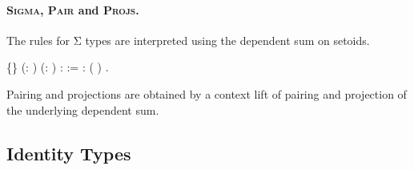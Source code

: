   \paragraph{\textsc{Sigma}, \textsc{Pair} and \textsc{Projs}.}
  The rules for Σ types are interpreted using the 
  dependent sum \coqdocdefinition{$\Sigma$} on setoids.  
\begin{coqdoccode}
\coqdocemptyline
\coqdocnoindent
{}  \{\} (: ) (: ) \coqdoceol
\coqdocindent{1.00em}
:   := \coqdocnotation{(} \coqdocvar{$\gamma$}: \coqdocnotation{[}\coqdocnotation{]} \coqdocdefinition{$\Sigma$} ( \coqdocnotation{$\star$} \coqdocvariable{$\gamma$})\coqdocnotation{;}   \coqdocnotation{)}.\coqdoceol
\coqdocemptyline
\end{coqdoccode}
\noindent Pairing and projections are obtained
  by a context lift of pairing and projection of the underlying dependent sum.
\begin{coqdoccode}
\coqdocemptyline
\coqdocemptyline
\end{coqdoccode}


\subsection{Identity Types}


